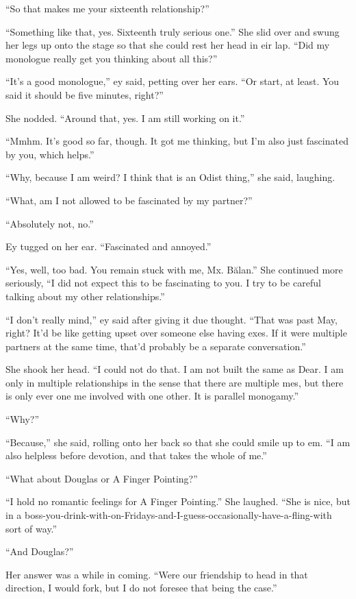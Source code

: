 ``So that makes me your sixteenth relationship?''

``Something like that, yes. Sixteenth truly serious one.'' She slid over and swung her legs up onto the stage so that she could rest her head in eir lap. ``Did my monologue really get you thinking about all this?''

``It's a good monologue,'' ey said, petting over her ears. ``Or start, at least. You said it should be five minutes, right?''

She nodded. ``Around that, yes. I am still working on it.''

``Mmhm. It's good so far, though. It got me thinking, but I'm also just fascinated by you, which helps.''

``Why, because I am weird? I think that is an Odist thing,'' she said, laughing.

``What, am I not allowed to be fascinated by my partner?''

``Absolutely not, no.''

Ey tugged on her ear. ``Fascinated and annoyed.''

``Yes, well, too bad. You remain stuck with me, Mx. Bălan.'' She continued more seriously, ``I did not expect this to be fascinating to you. I try to be careful talking about my other relationships.''

``I don't really mind,'' ey said after giving it due thought. ``That was past May, right? It'd be like getting upset over someone else having exes. If it were multiple partners at the same time, that'd probably be a separate conversation.''

She shook her head. ``I could not do that. I am not built the same as Dear. I am only in multiple relationships in the sense that there are multiple mes, but there is only ever one me involved with one other. It is parallel monogamy.''

``Why?''

``Because,'' she said, rolling onto her back so that she could smile up to em. ``I am also helpless before devotion, and that takes the whole of me.''

``What about Douglas or A Finger Pointing?''

``I hold no romantic feelings for A Finger Pointing.'' She laughed. ``She is nice, but in a boss-you-drink-with-on-Fridays-and-I-guess-occasionally-have-a-fling-with sort of way.''

``And Douglas?''

Her answer was a while in coming. ``Were our friendship to head in that direction, I would fork, but I do not foresee that being the case.''


